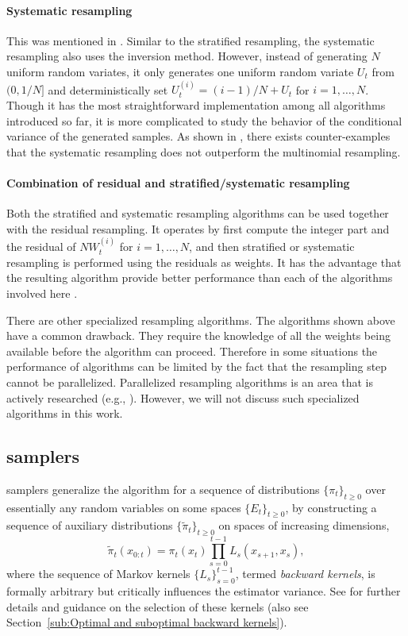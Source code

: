 \paragraph{Systematic resampling} This was mentioned in \cite{Whitley:1994vx}. Similar to the stratified resampling, the systematic resampling also uses the inversion method. However, instead of generating $N$ uniform random variates, it only generates one uniform random variate $U_t$ from $(0, 1/N]$ and deterministically set $U_t^{(i)} = (i - 1)/N + U_t$ for $i = 1,\dots,N$. Though it has the most straightforward implementation among all algorithms introduced so far, it is more complicated to study the behavior of the conditional variance of the generated samples. As shown in \cite{Douc:2005wa}, there exists counter-examples that the systematic resampling does not outperform the multinomial resampling.

\paragraph{Combination of residual and stratified/systematic resampling} Both the stratified and systematic resampling algorithms can be used together with the residual resampling. It operates by first compute the integer part and the residual of $NW_t^{(i)}$ for $i = 1,\dots,N$, and then stratified or systematic resampling is performed using the residuals as weights. It has the advantage that the resulting algorithm provide better performance than each of the algorithms involved here \cite{Douc:2005wa}.

There are other specialized resampling algorithms. The algorithms shown above have a common drawback. They require the knowledge of all the weights being available before the algorithm can proceed. Therefore in some situations the performance of \smc algorithms can be limited by the fact that the resampling step cannot be parallelized. Parallelized resampling algorithms is an area that is actively researched (e.g., \cite{Jun:2011vx,Murray:2013vx}). However, we will not discuss such specialized algorithms in this work.

\subsection[SMC samplers]{\protect\smc samplers}
\label{sub:SMC Samplers}

\smc samplers generalize the \sis algorithm for a sequence of distributions $\{\pi_t\}_{t\ge0}$ over essentially any random variables on some spaces $\{E_t\}_{t\ge0}$, by constructing a sequence of auxiliary distributions $\{\tilde\pi_t\}_{t\ge0}$ on spaces of increasing dimensions,
\begin{equation}
  \tilde\pi_t(x_{0:t})=\pi_t (x_t) \prod_{s=0}^{t-1} L_s(x_{s+1},x_s),
\end{equation}
where the sequence of Markov kernels $\{L_s\}_{s=0}^{t-1}$, termed \emph{backward kernels}, is formally arbitrary but critically influences the estimator variance. See \cite{DelMoral:2006hc} for further details and guidance on the selection of these kernels (also see Section~\ref{sub:Optimal and suboptimal backward kernels}).

